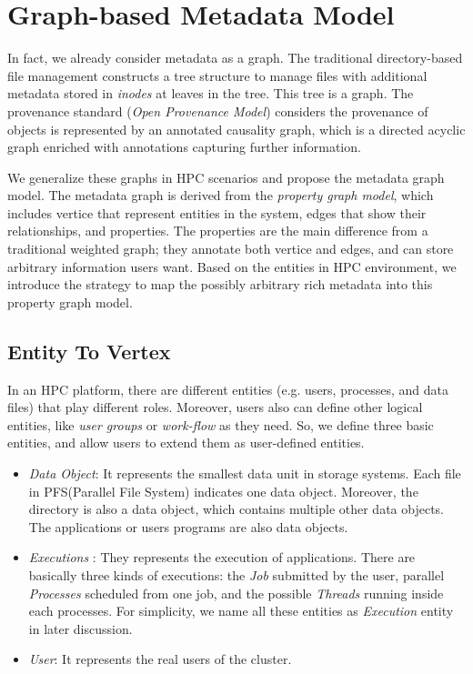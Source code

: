 \section{Graph-based Metadata Model}
In fact, we already consider metadata as a graph. The traditional directory-based file management constructs a tree structure to manage files with additional metadata stored in \textit{inodes} at leaves in the tree. This tree is a graph. The provenance standard (\textit{Open Provenance Model}) considers the provenance of objects is represented by an annotated causality graph, which is a directed acyclic graph enriched with annotations capturing further information. 

We generalize these graphs in HPC scenarios and propose the metadata graph model. The metadata graph is derived from the \textit{property graph model}, which includes vertice that represent entities in the system, edges that show their relationships, and properties. The properties are the main difference from a traditional weighted graph; they annotate both vertice and edges, and can store arbitrary information users want. Based on the entities in HPC environment, we introduce the strategy to map the possibly arbitrary rich metadata into this property graph model.

\subsection{Entity To Vertex}

In an HPC platform, there are different entities (e.g. users, processes, and data files) that play different roles. Moreover, users also can define other logical entities, like \textit{user groups} or \textit{work-flow} as they need. 
So, we define three basic entities, and allow users to extend them as user-defined entities.

\begin{itemize}
\item \textit{Data Object}: It represents the smallest data unit in storage systems. Each file in PFS(Parallel File System) indicates one data object. Moreover, the directory is also a data object, which contains multiple other data objects. The applications or users programs are also data objects.

\item \textit{Executions }: They represents the execution of applications. There are basically three kinds of executions: the \textit{Job} submitted by
the user, parallel \textit{Processes} scheduled from one job, and the possible \textit{Threads} running inside each processes. For simplicity, we name all these entities as \textit{Execution} entity in later discussion.

\item \textit{User}: It represents the real users of the cluster.
\end{itemize}

